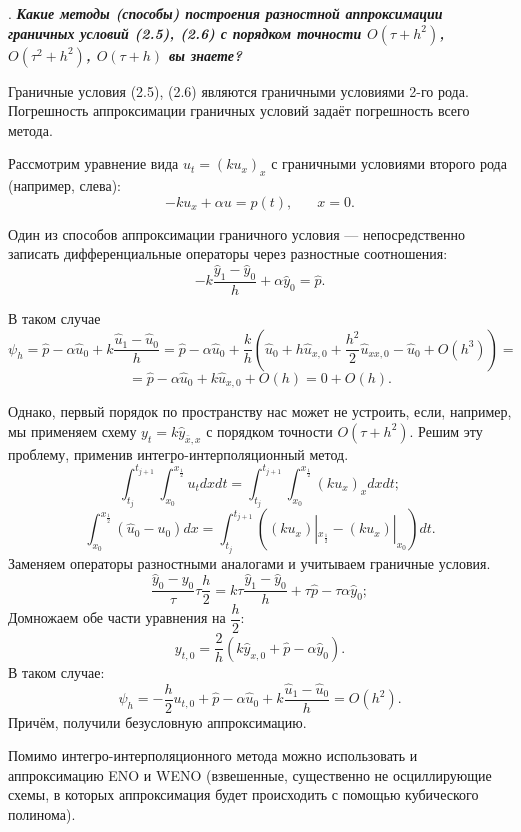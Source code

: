 \documentclass[12pt, a4paper]{article}
\newcounter{mycounter}
\newcommand{\quastion}[1]{%
	\stepcounter{mycounter}%
	\textbf{\themycounter}.  %
	\textbf{\textit{#1}}
	
}
\begin{document}
	
	
	
	\clearpage %
	\quastion{Какие методы (способы) построения разностной аппроксимации граничных условий (2.5), (2.6) с порядком точности $O(\tau + h^2)$, $O(\tau^2 + h^2)$, $O(\tau + h)$ вы знаете?}
	
	Граничные условия (2.5), (2.6) являются граничными условиями 2-го рода. Погрешность аппроксимации граничных условий задаёт погрешность всего метода.
	
	Рассмотрим уравнение вида
	$
	u_t = (k u_x)_x
	$
с граничными условиями второго рода (например, слева):
\[
	-ku_x + \alpha u = p(t), \phantom{xxx} x = 0.
\]

Один из способов аппроксимации граничного условия --- непосредственно записать дифференциальные операторы через разностные соотношения:
\[
-k \dfrac{\hat{y}_1 - \hat{y}_0}{h} + \alpha \hat{y}_0 = \hat{p}.
\]

В таком случае
\[
\psi_h = \hat{p} - \alpha\hat{u}_0 + k\dfrac{\hat{u}_1-\hat{u}_0}{h} =  \hat{p} - \alpha\hat{u}_0 + \dfrac{k}{h} (\hat{u}_0 +h\hat{u}_{x,0}+\dfrac{h^2}{2}\hat{u}_{xx,0}-\hat{u}_0+O(h^3))=
\]
\[
= \hat{p} - \alpha\hat{u}_0 + k\hat{u}_{x,0} + O(h) = 0 + O(h).
\]

Однако, первый порядок по пространству нас может не устроить, если, например, мы применяем схему $y_t = k\hat{y}_{\bar{x},x}$ с порядком точности $O(\tau+h^2)$. Решим эту проблему, применив интегро-интерполяционный метод.
\[
\int_{t_j}^{t_{j+1}}\int_{x_0}^{x_{\frac12}} u_t dx dt =  \int_{t_j}^{t_{j+1}}\int_{x_0}^{x_{\frac12}} (ku_x)_x dx dt;
\]
\[
\int_{x_0}^{x_{\frac12}} (\hat{u}_0 - u_0) dx = \int_{t_j}^{t_{j+1}} ((ku_x)|_{x_{\frac12}}-(ku_x)|_{x_{0}})dt.
\]
Заменяем операторы разностными аналогами и учитываем граничные условия.
\[
\dfrac{\hat{y}_0-y_0}{\tau}\tau \dfrac{h}{2} = k\tau \dfrac{\hat{y}_1-\hat{y}_0}{h} + \tau \hat{p} - \tau \alpha \hat{y}_0;
\]
Домножаем обе части уравнения на $\dfrac h2$:
\[
y_{t,0} = \frac2h(k\hat{y}_{x,0} + \hat{p}-\alpha\hat{y}_0).
\]
В таком случае:
\[
\psi_h =-\frac h2 u_{t,0} + \hat{p} - \alpha \hat{u}_0 + k \dfrac{\hat{u}_1-\hat{u}_0}{h} = O(h^2).
\]
Причём, получили безусловную аппроксимацию. 

Помимо интегро-интерполяционного метода можно использовать и аппроксимацию ENO и WENO (взвешенные, существенно не осциллирующие схемы, в которых аппроксимация будет происходить с помощью кубического полинома).

\end{document}

